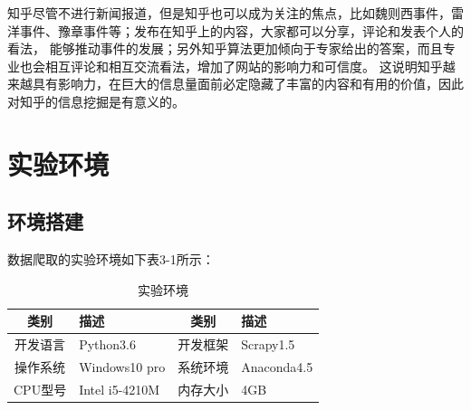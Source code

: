 \documentclass[bachelor,adobefonts]{jnuthesis}
\begin{document}
知乎尽管不进行新闻报道，但是知乎也可以成为关注的焦点，比如魏则西事件，雷洋事件、豫章事件等；发布在知乎上的内容，大家都可以分享，评论和发表个人的看法，
能够推动事件的发展；另外知乎算法更加倾向于专家给出的答案，而且专业也会相互评论和相互交流看法，增加了网站的影响力和可信度。
这说明知乎越来越具有影响力，在巨大的信息量面前必定隐藏了丰富的内容和有用的价值，因此对知乎的信息挖掘是有意义的。




\section{实验环境}
\subsection{环境搭建}
数据爬取的实验环境如下表3-1所示：
\begin{table}[h!]
  \centering\begin{tabular}{clcl}
    \toprule
    \textbf{类别} & \textbf{描述} & \textbf{类别}  & \textbf{描述}\\
    \midrule
    开发语言  &  Python3.6       & 开发框架  &  Scrapy1.5\\
    操作系统  &  Windows10 pro   & 系统环境  &  Anaconda4.5\\
    CPU型号   &  Intel i5-4210M  & 内存大小  & 4GB\\
    \bottomrule
  \end{tabular}
  \caption{实验环境}
\end{table}
\end{document}
